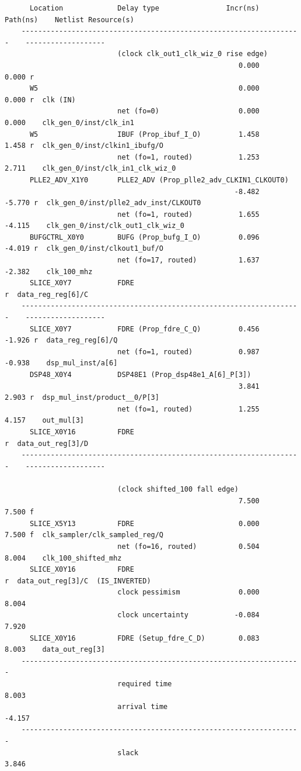 \documentclass{report}
\begin{document}
\begin{verbatim}
      Location             Delay type                Incr(ns)  Path(ns)    Netlist Resource(s)
    -------------------------------------------------------------------    -------------------
                           (clock clk_out1_clk_wiz_0 rise edge)
                                                        0.000     0.000 r  
      W5                                                0.000     0.000 r  clk (IN)
                           net (fo=0)                   0.000     0.000    clk_gen_0/inst/clk_in1
      W5                   IBUF (Prop_ibuf_I_O)         1.458     1.458 r  clk_gen_0/inst/clkin1_ibufg/O
                           net (fo=1, routed)           1.253     2.711    clk_gen_0/inst/clk_in1_clk_wiz_0
      PLLE2_ADV_X1Y0       PLLE2_ADV (Prop_plle2_adv_CLKIN1_CLKOUT0)
                                                       -8.482    -5.770 r  clk_gen_0/inst/plle2_adv_inst/CLKOUT0
                           net (fo=1, routed)           1.655    -4.115    clk_gen_0/inst/clk_out1_clk_wiz_0
      BUFGCTRL_X0Y0        BUFG (Prop_bufg_I_O)         0.096    -4.019 r  clk_gen_0/inst/clkout1_buf/O
                           net (fo=17, routed)          1.637    -2.382    clk_100_mhz
      SLICE_X0Y7           FDRE                                         r  data_reg_reg[6]/C
    -------------------------------------------------------------------    -------------------
      SLICE_X0Y7           FDRE (Prop_fdre_C_Q)         0.456    -1.926 r  data_reg_reg[6]/Q
                           net (fo=1, routed)           0.987    -0.938    dsp_mul_inst/a[6]
      DSP48_X0Y4           DSP48E1 (Prop_dsp48e1_A[6]_P[3])
                                                        3.841     2.903 r  dsp_mul_inst/product__0/P[3]
                           net (fo=1, routed)           1.255     4.157    out_mul[3]
      SLICE_X0Y16          FDRE                                         r  data_out_reg[3]/D
    -------------------------------------------------------------------    -------------------
  
                           (clock shifted_100 fall edge)
                                                        7.500     7.500 f  
      SLICE_X5Y13          FDRE                         0.000     7.500 f  clk_sampler/clk_sampled_reg/Q
                           net (fo=16, routed)          0.504     8.004    clk_100_shifted_mhz
      SLICE_X0Y16          FDRE                                         r  data_out_reg[3]/C  (IS_INVERTED)
                           clock pessimism              0.000     8.004    
                           clock uncertainty           -0.084     7.920    
      SLICE_X0Y16          FDRE (Setup_fdre_C_D)        0.083     8.003    data_out_reg[3]
    -------------------------------------------------------------------
                           required time                          8.003    
                           arrival time                          -4.157    
    -------------------------------------------------------------------
                           slack                                  3.846    
  
\end{verbatim}
\end{document}
